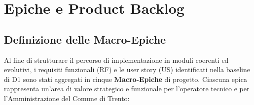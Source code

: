 \section{Epiche e Product Backlog}
\label{sec:epiche_backlog}

\subsection{Definizione delle Macro-Epiche}
Al fine di strutturare il percorso di implementazione in moduli coerenti ed evolutivi, i requisiti funzionali (RF) e le user story (US) identificati nella baseline di D1 sono stati aggregati in cinque \textbf{Macro-Epiche} di progetto. Ciascuna epica rappresenta un'area di valore strategico e funzionale per l'operatore tecnico e per l'Amministrazione del Comune di Trento:


